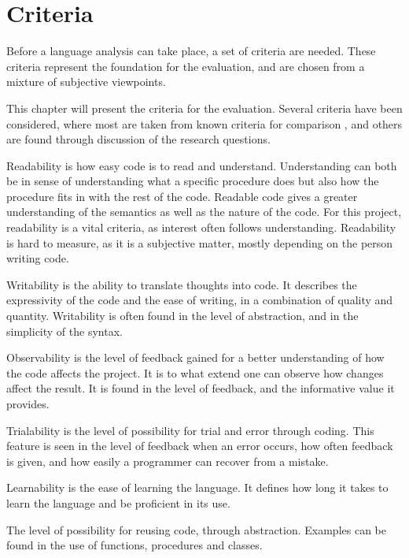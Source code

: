 \chapter{Criteria}
\label{chap:criteria}

Before a language analysis can take place, a set of criteria are needed. These criteria represent the foundation for the evaluation, and are chosen from a mixture of subjective viewpoints.

This chapter will present the criteria for the evaluation. Several criteria have been considered, where most are taken from known criteria for comparison \cite{design_criteria1} \cite{design_criteria2}, and others are found through discussion of the research questions.

\begin{description}[style=nextline]
\item[Readability] Readability is how easy code is to read and understand. Understanding can both be in sense of understanding what a specific procedure does but also how the procedure fits in with the rest of the code. Readable code gives a greater understanding of the semantics as well as the nature of the code. For this project, readability is a vital criteria, as interest often follows understanding. Readability is hard to measure, as it is a subjective matter, mostly depending on the person writing code.
\item[Writability] Writability is the ability to translate thoughts into code. It describes the expressivity of the code and the ease of writing, in a combination of quality and quantity. Writability is often found in the level of abstraction, and in the simplicity of the syntax.
\item[Observability] Observability is the level of feedback gained for a better understanding of how the code affects the project. It is to what extend one can observe how changes affect the result. It is found in the level of feedback, and the informative value it provides.
\item[Trialability] Trialability is the level of possibility for trial and error through coding. This feature is seen in the level of feedback when an error occurs, how often feedback is given, and how easily a programmer can recover from a mistake.
\item[Learnability] Learnability is the ease of learning the language. It defines how long it takes to learn the language and be proficient in its use.
\item[Reusability] The level of possibility for reusing code, through abstraction. Examples can be found in the use of functions, procedures and classes.

\end{description}
